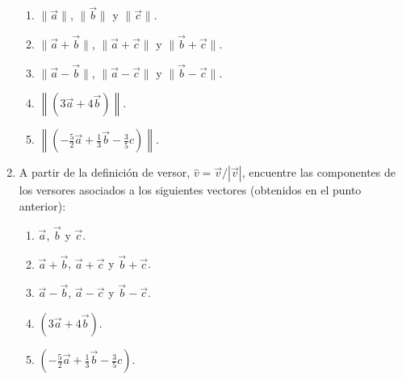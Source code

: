 \documentclass[a4paper,12pt]{article}
\begin{document}
\begin{enumerate}
    \begin{enumerate}
      \item $\| \vec a \|$, $\| \vec b \|$ y $\| \vec c \|$.
      \item $\| \vec a + \vec b \|$, $\| \vec a + \vec c \|$ y $\| \vec b + \vec c \|$.
      \item $\| \vec a - \vec b \|$, $\| \vec a - \vec c \|$ y $\| \vec b - \vec c \|$.
      \item $\left \| \left ( 3 \vec a + 4 \vec b \right ) \right \|$.
      \item $\left \| \left ( - \frac52 \vec a + \frac13 \vec b - \frac35 c \right ) \right \|$.
    \end{enumerate}
  \item A partir de la definición de versor, $\hat v = \vec v / |\vec v|$, encuentre las componentes de los versores asociados a los siguientes vectores (obtenidos en el punto anterior): 
    \begin{enumerate}
      \item $\vec a$, $\vec b$ y $\vec c$.
      \item $\vec a + \vec b$, $\vec a + \vec c$ y $\vec b + \vec c$.
      \item $\vec a - \vec b$, $\vec a - \vec c$ y $\vec b - \vec c$.
      \item $\left ( 3 \vec a + 4 \vec b \right )$.
      \item $\left ( - \frac52 \vec a + \frac13 \vec b - \frac35 c \right )$.
    \end{enumerate}


\end{enumerate}
\end{document}
